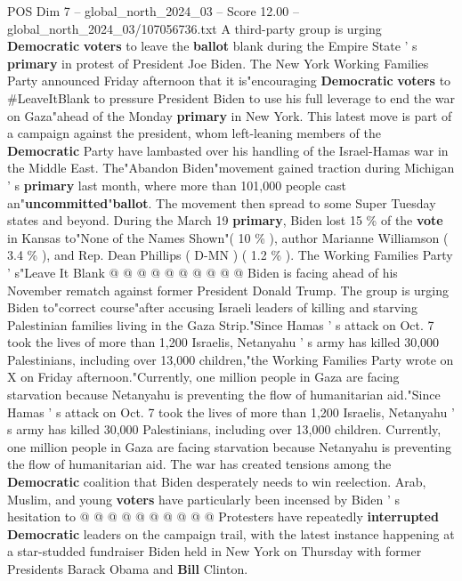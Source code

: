 \begin{textsample}{POS Dim 7 – global\_north\_2024\_03 – Score 12.00 – global\_north\_2024\_03/107056736.txt}  \label{ex:f7_pos_038}
A third-party group is urging \textbf{Democratic} \textbf{voters} to leave the \textbf{ballot} blank during the Empire State ' s \textbf{primary} in protest of President Joe Biden.
The New York Working Families Party announced Friday afternoon that it is"encouraging \textbf{Democratic} \textbf{voters} to \#LeaveItBlank to pressure President Biden to use his full leverage to end the war on Gaza"ahead of the Monday \textbf{primary} in New York.
This latest move is part of a campaign against the president, whom left-leaning members of the \textbf{Democratic} Party have lambasted over his handling of the Israel-Hamas war in the Middle East.
The"Abandon Biden"movement gained traction during Michigan ' s \textbf{primary} last month, where more than 101,000 people cast an"\textbf{uncommitted}"\textbf{ballot}.
The movement then spread to some Super Tuesday states and beyond.
During the March 19 \textbf{primary}, Biden lost 15 \% of the \textbf{vote} in Kansas to"None of the Names Shown"( 10 \% ), author Marianne Williamson ( 3.4 \% ), and Rep.
Dean Phillips ( D-MN ) ( 1.2 \% ).
The Working Families Party ' s"Leave It Blank @ @ @ @ @ @ @ @ @ @ Biden is facing ahead of his November rematch against former President Donald Trump.
The group is urging Biden to"correct course"after accusing Israeli leaders of killing and starving Palestinian families living in the Gaza Strip."Since Hamas ' s attack on Oct. 7 took the lives of more than 1,200 Israelis, Netanyahu ' s army has killed 30,000 Palestinians, including over 13,000 children,"the Working Families Party wrote on X on Friday afternoon."Currently, one million people in Gaza are facing starvation because Netanyahu is preventing the flow of humanitarian aid."Since Hamas ' s attack on Oct. 7 took the lives of more than 1,200 Israelis, Netanyahu ' s army has killed 30,000 Palestinians, including over 13,000 children.
Currently, one million people in Gaza are facing starvation because Netanyahu is preventing the flow of humanitarian aid.
The war has created tensions among the \textbf{Democratic} coalition that Biden desperately needs to win reelection.
Arab, Muslim, and young \textbf{voters} have particularly been incensed by Biden ' s hesitation to @ @ @ @ @ @ @ @ @ @ Protesters have repeatedly \textbf{interrupted} \textbf{Democratic} leaders on the campaign trail, with the latest instance happening at a star-studded fundraiser Biden held in New York on Thursday with former Presidents Barack Obama and \textbf{Bill} Clinton.

\end{textsample}
